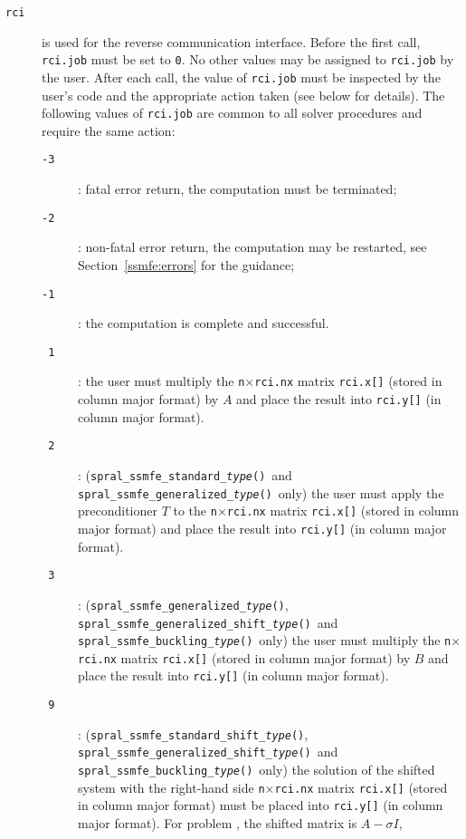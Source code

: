 \begin{description}
%
\item[\texttt{rci}] is used for the reverse communication interface.
Before the first call, {\tt rci.job} must be set to {\tt 0}.
No other values may be assigned to {\tt rci.job} by the user.
After each call,
the value of {\tt rci.job} must be inspected by the user's code
and the appropriate action taken (see below for details).
The following values of {\tt rci.job}
are common to all solver procedures 
and require the same action: 
%
\begin{description}
%
\item[\texttt{-3}]: fatal error return, the computation must be terminated;
%
\item[\texttt{-2}]: 
non-fatal error return, the computation may be restarted,
see Section~\ref{ssmfe:errors} for the guidance;
%
\item[\texttt{-1}]: the computation is complete and successful.
%
\item[\texttt{~1}]: 
the user must multiply the {\tt n}$\times${\tt rci.nx} matrix
{\tt rci.x[]} (stored in column major format) by $A$ and place the result into {\tt rci.y[]} (in column major format).
%
\item[\texttt{~2}]: 
({\tt spral\_ssmfe\_standard\_\textit{type}()}\ and {\tt spral\_ssmfe\_generalized\_\textit{type}()}\ only)
the user must
apply the preconditioner $T$ to the {\tt n}$\times${\tt rci.nx} matrix
{\tt rci.x[]} (stored in column major format) and place the result into {\tt rci.y[]} (in column major format).
%
\item[\texttt{~3}]: 
({\tt spral\_ssmfe\_generalized\_\textit{type}()},
 {\tt spral\_ssmfe\_generalized\_shift\_\textit{type}()}\ and\\
 {\tt spral\_ssmfe\_buckling\_\textit{type}()}\ only)
the user must multiply the {\tt n}$\times${\tt rci.nx} matrix
{\tt rci.x[]} (stored in column major format) by $B$ and place the result into {\tt rci.y[]} (in column major format).
%
\item[\texttt{~9}]:
({\tt spral\_ssmfe\_standard\_shift\_\textit{type}()},
 {\tt spral\_ssmfe\_generalized\_shift\_\textit{type}()}\ and\\
 {\tt spral\_ssmfe\_buckling\_\textit{type}()}\ only)
the solution of the shifted system
with the right-hand side {\tt n}$\times${\tt rci.nx} matrix {\tt rci.x[]}
(stored in column major format) must be placed into {\tt rci.y[]} (in column major format).
For problem , the shifted matrix is $A - \sigma I$,

\end{description}
\end{description}
